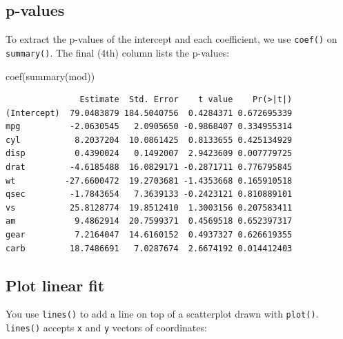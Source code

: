 \documentclass[
]{book}
\newenvironment{Shaded}{\begin{snugshade}}{\end{snugshade}}
\newcommand{\AttributeTok}[1]{\textcolor[rgb]{0.77,0.63,0.00}{#1}}
\newcommand{\DecValTok}[1]{\textcolor[rgb]{0.00,0.00,0.81}{#1}}
\newcommand{\FunctionTok}[1]{\textcolor[rgb]{0.00,0.00,0.00}{#1}}
\newcommand{\NormalTok}[1]{#1}
\newcommand{\OtherTok}[1]{\textcolor[rgb]{0.56,0.35,0.01}{#1}}
\newcommand{\SpecialCharTok}[1]{\textcolor[rgb]{0.00,0.00,0.00}{#1}}
\newcommand{\StringTok}[1]{\textcolor[rgb]{0.31,0.60,0.02}{#1}}
\begin{document}
\hypertarget{p-values}{%
\subsection{p-values}\label{p-values}}

To extract the p-values of the intercept and each coefficient, we use \texttt{coef()} on \texttt{summary()}. The final (4th) column lists the p-values:

\begin{Shaded}
\begin{Highlighting}[]
\FunctionTok{coef}\NormalTok{(}\FunctionTok{summary}\NormalTok{(mod))}
\end{Highlighting}
\end{Shaded}

\begin{verbatim}
               Estimate  Std. Error    t value    Pr(>|t|)
(Intercept)  79.0483879 184.5040756  0.4284371 0.672695339
mpg          -2.0630545   2.0905650 -0.9868407 0.334955314
cyl           8.2037204  10.0861425  0.8133655 0.425134929
disp          0.4390024   0.1492007  2.9423609 0.007779725
drat         -4.6185488  16.0829171 -0.2871711 0.776795845
wt          -27.6600472  19.2703681 -1.4353668 0.165910518
qsec         -1.7843654   7.3639133 -0.2423121 0.810889101
vs           25.8128774  19.8512410  1.3003156 0.207583411
am            9.4862914  20.7599371  0.4569518 0.652397317
gear          7.2164047  14.6160152  0.4937327 0.626619355
carb         18.7486691   7.0287674  2.6674192 0.014412403
\end{verbatim}

\hypertarget{plot-linear-fit}{%
\subsection{Plot linear fit}\label{plot-linear-fit}}

You use \texttt{lines()} to add a line on top of a scatterplot drawn with \texttt{plot()}.\\
\texttt{lines()} accepts \texttt{x} and \texttt{y} vectors of coordinates:

\begin{Shaded}
\end{Shaded}
\end{document}
